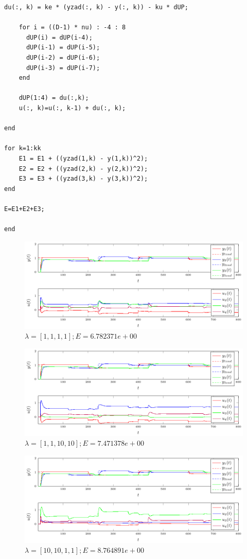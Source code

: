 \documentclass[a4paper,titlepage,11pt,twosides,floatssmall]{mwrep}
\begin{document}
\begin{lstlisting}[style=Matlab-editor]
    du(:, k) = ke * (yzad(:, k) - y(:, k)) - ku * dUP;
    
    for i = ((D-1) * nu) : -4 : 8
      dUP(i) = dUP(i-4);
      dUP(i-1) = dUP(i-5);
      dUP(i-2) = dUP(i-6);
      dUP(i-3) = dUP(i-7);
    end
    
    dUP(1:4) = du(:,k);
    u(:, k)=u(:, k-1) + du(:, k);
   
end

for k=1:kk
    E1 = E1 + ((yzad(1,k) - y(1,k))^2);
    E2 = E2 + ((yzad(2,k) - y(2,k))^2);
    E3 = E3 + ((yzad(3,k) - y(3,k))^2);
end

E=E1+E2+E3;

end

\end{lstlisting}


\begin{figure}[H]
	\centering
	\includegraphics[scale=1]{../wykresy/zad6_dmc_1.pdf}
	\caption{$\lambda = [1, 1, 1, 1]; E = 6.782371e+00$}
\end{figure}


\begin{figure}[H]
	\centering
	\includegraphics[scale=1]{../wykresy/zad6_dmc_2.pdf}
	\caption{$\lambda = [1, 1, 10, 10]; E = 7.471378e+00$}
\end{figure}


\begin{figure}[H]
	\centering
	\includegraphics[scale=1]{../wykresy/zad6_dmc_3.pdf}
	\caption{$\lambda = [10, 10, 1, 1]; E = 8.764891e+00$}
\end{figure}
\end{document}
